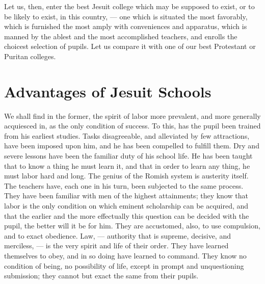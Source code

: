 \documentclass[]{book}
\begin{document}
Let us, then, enter the best Jesuit college which may be supposed to exist, or to be likely to exist, in this country, --- one which is situated the most favorably, which is furnished the most amply with conveniences and apparatus, which is manned by the ablest and the most accomplished teachers, and enrolls the choicest selection of pupils. Let us compare it with one of our best Protestant or Puritan colleges.

\hypertarget{advantages-of-jesuit-schools}{%
\chapter{Advantages of Jesuit Schools}\label{advantages-of-jesuit-schools}}

We shall find in the former, the spirit of labor more prevalent, and more generally acquiesced in, as the only condition of success. To this, has the pupil been trained from his earliest studies. Tasks disagreeable, and alleviated by few attractions, have been imposed upon him, and he has been compelled to fulfill them. Dry and severe lessons have been the familiar duty of his school life. He has been taught that to know a thing he must learn it, and that in order to learn any thing, he must labor hard and long. The genius of the Romish system is austerity itself. The teachers have, each one in his turn, been subjected to the same process. They have been familiar with men of the highest attainments; they know that labor is the only condition on which eminent scholarship can be acquired, and that the earlier and the more effectually this question can be decided with the pupil, the better will it be for him. They are accustomed, also, to use compulsion, and to exact obedience. Law, --- authority that is supreme, decisive, and merciless, --- is the very spirit and life of their order. They have learned themselves to obey, and in so doing have learned to command. They know no condition of being, no possibility of life, except in prompt and unquestioning submission; they cannot but exact the same from their pupils.
\end{document}

